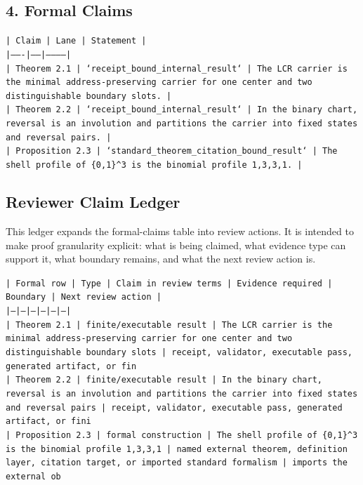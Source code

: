 \documentclass[11pt]{article}
\begin{document}
\subsection*{4. Formal Claims}

\noindent\texttt{| Claim | Lane | Statement |}\\
\noindent\texttt{|-------|------|-----------|}\\
\noindent\texttt{| Theorem 2.1 | `receipt\_bound\_internal\_result` | The LCR carrier is the minimal address-preserving carrier for one center and two distinguishable boundary slots. |}\\
\noindent\texttt{| Theorem 2.2 | `receipt\_bound\_internal\_result` | In the binary chart, reversal is an involution and partitions the carrier into fixed states and reversal pairs. |}\\
\noindent\texttt{| Proposition 2.3 | `standard\_theorem\_citation\_bound\_result` | The shell profile of \{0,1\}\textasciicircum{}3 is the binomial profile 1,3,3,1. |}\\

\subsection*{Reviewer Claim Ledger}

This ledger expands the formal-claims table into review actions. It is intended to make proof granularity explicit: what is being claimed, what evidence type can support it, what boundary remains, and what the next review action is.

\noindent\texttt{| Formal row | Type | Claim in review terms | Evidence required | Boundary | Next review action |}\\
\noindent\texttt{|---|---|---|---|---|---|}\\
\noindent\texttt{| Theorem 2.1 | finite/executable result | The LCR carrier is the minimal address-preserving carrier for one center and two distinguishable boundary slots | receipt, validator, executable pass, generated artifact, or fin}\\
\noindent\texttt{| Theorem 2.2 | finite/executable result | In the binary chart, reversal is an involution and partitions the carrier into fixed states and reversal pairs | receipt, validator, executable pass, generated artifact, or fini}\\
\noindent\texttt{| Proposition 2.3 | formal construction | The shell profile of \{0,1\}\textasciicircum{}3 is the binomial profile 1,3,3,1 | named external theorem, definition layer, citation target, or imported standard formalism | imports the external ob}\\
\end{document}
